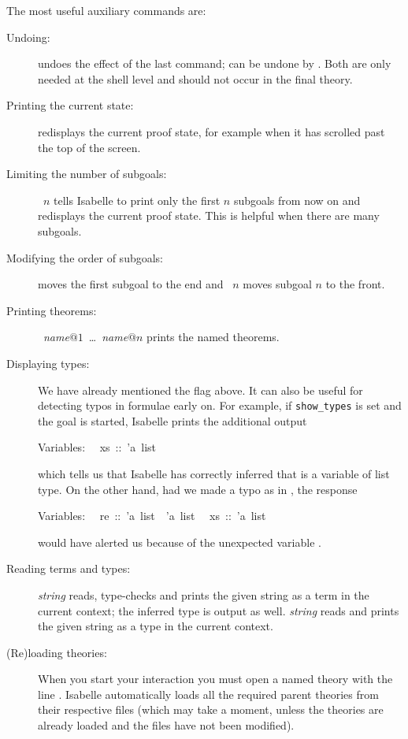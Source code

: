 The most useful auxiliary commands are:
\begin{description}
\item[Undoing:]  undoes the effect of the
  last command;  can be undone by
  .  Both are only needed at the shell
  level and should not occur in the final theory.
\item[Printing the current state:]  redisplays
  the current proof state, for example when it has scrolled past the top of
  the screen.
\item[Limiting the number of subgoals:] ~$n$ tells Isabelle to
  print only the first $n$ subgoals from now on and redisplays the current
  proof state. This is helpful when there are many subgoals.
\item[Modifying the order of subgoals:]
 moves the first subgoal to the end and
~$n$ moves subgoal $n$ to the front.
\item[Printing theorems:]
  ~\textit{name}$@1$~\dots~\textit{name}$@n$
  prints the named theorems.
\item[Displaying types:] We have already mentioned the flag
   above. It can also be useful for detecting typos in
  formulae early on. For example, if \texttt{show_types} is set and the goal
   is started, Isabelle prints the additional output
\par\noindent
\begin{isabelle}%
Variables:\isanewline
~~xs~::~'a~list
\end{isabelle}%
\par\noindent
which tells us that Isabelle has correctly inferred that
 is a variable of list type. On the other hand, had we
made a typo as in , the response
\par\noindent
\begin{isabelle}%
Variables:\isanewline
~~re~::~'a~list~{\isasymRightarrow}~'a~list\isanewline
~~xs~::~'a~list%
\end{isabelle}%
\par\noindent
would have alerted us because of the unexpected variable .
\item[Reading terms and types:] 
  \textit{string} reads, type-checks and prints the given string as a term in
  the current context; the inferred type is output as well.
   \textit{string} reads and prints the given
  string as a type in the current context.
\item[(Re)loading theories:] When you start your interaction you must open a
  named theory with the line . Isabelle
  automatically loads all the required parent theories from their respective
  files (which may take a moment, unless the theories are already loaded and
  the files have not been modified).
  

\end{description}

